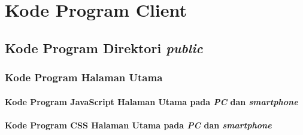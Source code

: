 \chapter{Kode Program Client}
\label{lamp:A}

%
%
%

\setcounter{secnumdepth}{4}


\section{Kode Program Direktori \textit{public}}
\subsection{Kode Program Halaman Utama}
\subsubsection{Kode Program JavaScript Halaman Utama pada \textit{PC} dan \textit{smartphone}}


\subsubsection{Kode Program CSS Halaman Utama pada \textit{PC} dan \textit{smartphone}}


%
%
%

